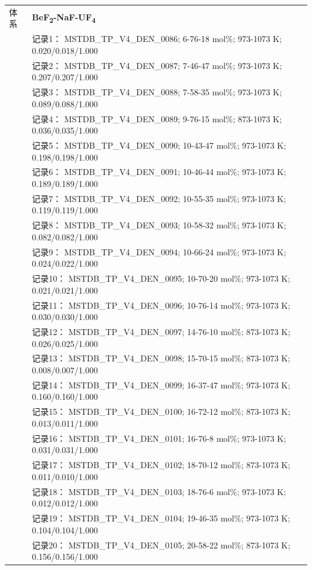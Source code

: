 \documentclass[12pt]{article}
\begin{document}
{\begin{longtable}[]{@{}
  >{\raggedright\arraybackslash}p{}
  >{\raggedright\arraybackslash}p{}@{}}
\midrule
体系 & \textbf{BeF\textsubscript{2}-NaF-UF\textsubscript{4}} \\
 & 记录1： MSTDB\_TP\_V4\_DEN\_0086; 6-76-18 mol\%; 973-1073 K; 0.020/0.018/1.000 \\
 & 记录2： MSTDB\_TP\_V4\_DEN\_0087; 7-46-47 mol\%; 973-1073 K; 0.207/0.207/1.000 \\
 & 记录3： MSTDB\_TP\_V4\_DEN\_0088; 7-58-35 mol\%; 973-1073 K; 0.089/0.088/1.000 \\
 & 记录4： MSTDB\_TP\_V4\_DEN\_0089; 9-76-15 mol\%; 873-1073 K; 0.036/0.035/1.000 \\
 & 记录5： MSTDB\_TP\_V4\_DEN\_0090; 10-43-47 mol\%; 973-1073 K; 0.198/0.198/1.000 \\
 & 记录6： MSTDB\_TP\_V4\_DEN\_0091; 10-46-44 mol\%; 973-1073 K; 0.189/0.189/1.000 \\
 & 记录7： MSTDB\_TP\_V4\_DEN\_0092; 10-55-35 mol\%; 973-1073 K; 0.119/0.119/1.000 \\
 & 记录8： MSTDB\_TP\_V4\_DEN\_0093; 10-58-32 mol\%; 973-1073 K; 0.082/0.082/1.000 \\
 & 记录9： MSTDB\_TP\_V4\_DEN\_0094; 10-66-24 mol\%; 973-1073 K; 0.024/0.022/1.000 \\
 & 记录10： MSTDB\_TP\_V4\_DEN\_0095; 10-70-20 mol\%; 973-1073 K; 0.021/0.021/1.000 \\
 & 记录11： MSTDB\_TP\_V4\_DEN\_0096; 10-76-14 mol\%; 973-1073 K; 0.030/0.030/1.000 \\
 & 记录12： MSTDB\_TP\_V4\_DEN\_0097; 14-76-10 mol\%; 873-1073 K; 0.026/0.025/1.000 \\
 & 记录13： MSTDB\_TP\_V4\_DEN\_0098; 15-70-15 mol\%; 873-1073 K; 0.008/0.007/1.000 \\
 & 记录14： MSTDB\_TP\_V4\_DEN\_0099; 16-37-47 mol\%; 973-1073 K; 0.160/0.160/1.000 \\
 & 记录15： MSTDB\_TP\_V4\_DEN\_0100; 16-72-12 mol\%; 873-1073 K; 0.013/0.011/1.000 \\
 & 记录16： MSTDB\_TP\_V4\_DEN\_0101; 16-76-8 mol\%; 973-1073 K; 0.031/0.031/1.000 \\
 & 记录17： MSTDB\_TP\_V4\_DEN\_0102; 18-70-12 mol\%; 873-1073 K; 0.011/0.010/1.000 \\
 & 记录18： MSTDB\_TP\_V4\_DEN\_0103; 18-76-6 mol\%; 973-1073 K; 0.012/0.012/1.000 \\
 & 记录19： MSTDB\_TP\_V4\_DEN\_0104; 19-46-35 mol\%; 973-1073 K; 0.104/0.104/1.000 \\
 & 记录20： MSTDB\_TP\_V4\_DEN\_0105; 20-58-22 mol\%; 873-1073 K; 0.156/0.156/1.000 \\

\end{longtable}}
\end{document}
